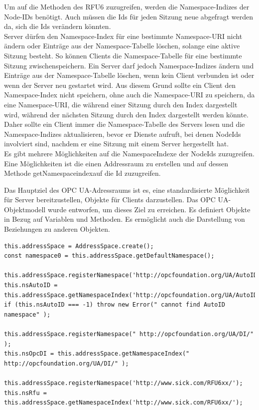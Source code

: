 Um auf die Methoden des RFU6 zuzugreifen, werden die Namespace-Indizes der Node-IDs benötigt. Auch müssen die Ids für jeden Sitzung neue abgefragt werden da, sich die Ids verändern könnten.\\

Server dürfen den Namespace-Index für eine bestimmte Namespace-URI nicht ändern oder Einträge aus der Namespace-Tabelle löschen, solange eine aktive Sitzung besteht. So können Clients die Namespace-Tabelle für eine bestimmte Sitzung zwischenspeichern. Ein Server darf jedoch Namespace-Indizes ändern und Einträge aus der Namespace-Tabelle löschen, wenn kein Client verbunden ist oder wenn der Server neu gestartet wird. 
Aus diesem Grund sollte ein Client den Namespace-Index nicht speichern, ohne auch die Namespace-URI zu speichern, da eine Namespace-URI, die während einer Sitzung durch den Index  \flqq dargestellt wird, während der nächsten Sitzung durch den Index  \flqq dargestellt werden könnte. Daher sollte ein Client immer die Namespace-Tabelle des Servers lesen und die Namespace-Indizes aktualisieren, bevor er Dienste aufruft, bei denen NodeIds involviert sind, nachdem er eine Sitzung mit einem Server hergestellt hat.\\

Es gibt mehrere Möglichkeiten auf die NamespaceIndexe der NodeIds zuzugreifen.\\ 

Eine Möglichkeiten  ist die einen Addressraum zu erstellen und auf dessen Methode \frqq getNamespaceindex\flqq   auf die Id zuzugreifen.

Das Hauptziel des OPC UA-Adressraums ist es, eine standardisierte Möglichkeit für Server bereitzustellen, Objekte für Clients darzustellen. Das OPC UA-Objektmodell wurde entworfen, um dieses Ziel zu erreichen. Es definiert Objekte in Bezug auf Variablen und Methoden. Es ermöglicht auch die Darstellung von Beziehungen zu anderen Objekten.\cite{.11.04.2020}\\

\begin{lstlisting}[style=JavaScript, caption={Zugriff auf die Ids über den Addressraum}]
this.addressSpace = AddressSpace.create();
const namespace0 = this.addressSpace.getDefaultNamespace();

this.addressSpace.registerNamespace('http://opcfoundation.org/UA/AutoID/');
this.nsAutoID = this.addressSpace.getNamespaceIndex('http://opcfoundation.org/UA/AutoID/');
if (this.nsAutoID === -1) throw new Error(" cannot find AutoID namespace" );

this.addressSpace.registerNamespace(" http://opcfoundation.org/UA/DI/" );
this.nsOpcDI = this.addressSpace.getNamespaceIndex(" http://opcfoundation.org/UA/DI/" );

this.addressSpace.registerNamespace('http://www.sick.com/RFU6xx/');
this.nsRfu = this.addressSpace.getNamespaceIndex('http://www.sick.com/RFU6xx/');
\end{lstlisting}

